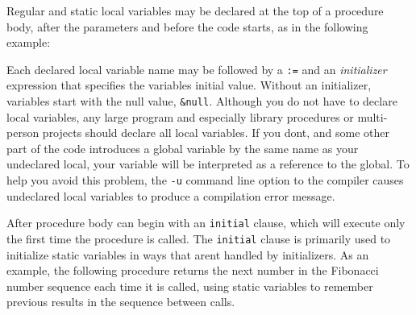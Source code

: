 Regular and static local variables may be declared at the top of a
procedure body, after the parameters and before the code starts, as in
the following example:


Each declared local variable name may be followed by a \texttt{:=} and
an \textit{initializer} expression that specifies the
variable{\textquotesingle}s initial value. Without an initializer,
variables start with the null value, \texttt{\&null}\textit{. }Although
you do not have to declare local variables, any large program and
especially library procedures or multi-person projects should declare
all local variables. If you don{\textquotesingle}t, and some other part
of the code introduces a global variable by the same name as your
undeclared local, your variable will be interpreted as a
reference to the global. To help you avoid this
problem, the \texttt{{}-u} command line option to the
compiler causes undeclared
local variables to produce a compilation error message.

After procedure body can begin with an \texttt{initial} clause, which will execute only the first time
the procedure is called. The \texttt{initial} clause is primarily used
to initialize static variables in ways that aren{\textquotesingle}t
handled by initializers. As an example, the following procedure returns
the next number in the Fibonacci number sequence each time it is
called, using static variables to remember previous results in the
sequence between calls.


